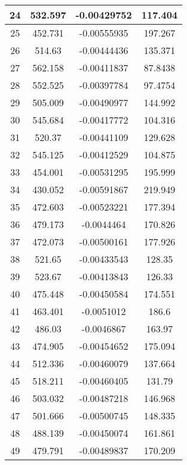\begin{table}[h]
{\begin{tabular}{|c|c|c|c|}
24   &   532.597   &   -0.00429752   &   117.404  \\  \hline  
25   &   452.731   &   -0.00555935   &   197.267  \\  \hline  
26   &   514.63   &   -0.00444436   &   135.371  \\  \hline  
27   &   562.158   &   -0.00411837   &   87.8438  \\  \hline  
28   &   552.525   &   -0.00397784   &   97.4754  \\  \hline  
29   &   505.009   &   -0.00490977   &   144.992  \\  \hline  
30   &   545.684   &   -0.00417772   &   104.316  \\  \hline  
31   &   520.37   &   -0.00441109   &   129.628  \\  \hline  
32   &   545.125   &   -0.00412529   &   104.875  \\  \hline  
33   &   454.001   &   -0.00531295   &   195.999  \\  \hline  
34   &   430.052   &   -0.00591867   &   219.949  \\  \hline  
35   &   472.603   &   -0.00523221   &   177.394  \\  \hline  
36   &   479.173   &   -0.0044464   &   170.826  \\  \hline  
37   &   472.073   &   -0.00500161   &   177.926  \\  \hline  
38   &   521.65   &   -0.00433543   &   128.35  \\  \hline  
39   &   523.67   &   -0.00413843   &   126.33  \\  \hline  
40   &   475.448   &   -0.00450584   &   174.551  \\  \hline  
41   &   463.401   &   -0.0051012   &   186.6  \\  \hline  
42   &   486.03   &   -0.0046867   &   163.97  \\  \hline  
43   &   474.905   &   -0.00454652   &   175.094  \\  \hline  
44   &   512.336   &   -0.00460079   &   137.664  \\  \hline  
45   &   518.211   &   -0.00460405   &   131.79  \\  \hline  
46   &   503.032   &   -0.00487218   &   146.968  \\  \hline  
47   &   501.666   &   -0.00500745   &   148.335  \\  \hline  
48   &   488.139   &   -0.00450074   &   161.861  \\  \hline  
49   &   479.791   &   -0.00489837   &   170.209  \\  \hline  

\end{tabular}}
\end{table}

